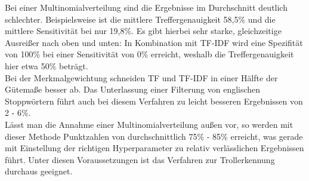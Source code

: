 Bei einer Multinomialverteilung sind die Ergebnisse im Durchschnitt deutlich schlechter. Beispielsweise ist die mittlere Treffergenauigkeit 58,5\% und die mittlere Sensitivität bei nur 19,8\%. Es gibt hierbei sehr starke, gleichzeitige Ausreißer nach oben und unten: In Kombination mit TF-IDF wird eine Spezifität von 100\% bei einer Sensitivität von 0\% erreicht, weshalb die Treffergenauigkeit hier etwa 50\% beträgt.\\
Bei der Merkmalgewichtung schneiden TF und TF-IDF in einer Hälfte der Gütemaße besser ab. Das Unterlassung einer Filterung von englischen Stoppwörtern führt auch bei diesem Verfahren zu leicht besseren Ergebnissen von 2 - 6\%.\\
Lässt man die Annahme einer Multinomialverteilung außen vor, so werden mit dieser Methode Punktzahlen von durchschnittlich 75\% - 85\% erreicht, was gerade mit Einstellung der richtigen Hyperparameter zu relativ verlässlichen Ergebnissen führt. Unter diesen Voraussetzungen ist das Verfahren zur Trollerkennung durchaus geeignet.
